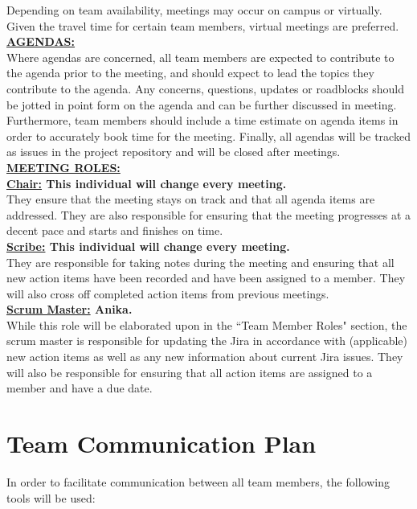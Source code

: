 \documentclass{article}
\begin{document}
Depending on team availability, meetings may occur on campus or virtually. 
Given the travel time for certain team members, virtual meetings are preferred.\\

\noindent \textbf{\underline{AGENDAS:}} \\

Where agendas are concerned, all team members are expected to contribute to the agenda prior to the meeting, 
and should expect to lead the topics they contribute to the agenda. 
Any concerns, questions, updates or roadblocks should be jotted in point form on the agenda and can be further discussed in meeting. 
Furthermore, team members should include a time estimate on agenda items in order to accurately book time for the meeting.
Finally, all agendas will be tracked as issues in the project repository and will be closed after meetings. \\

\noindent \textbf{\underline{MEETING ROLES:}} \\

\noindent \textbf{\underline{Chair:} This individual will change every meeting. } \\
\noindent They ensure that the meeting stays on track and that all agenda items are addressed. 
They are also responsible for ensuring that the meeting progresses at a decent pace and starts and finishes on time. \\

\noindent \textbf{\underline{Scribe:} This individual will change every meeting.} \\
\noindent They are responsible for taking notes during the meeting and ensuring that 
all new action items have been recorded and have been assigned to a member.
They will also cross off completed action items from previous meetings.\\

\noindent \textbf{\underline{Scrum Master:} Anika.} \\
\noindent While this role will be elaborated upon in the ``Team Member Roles" section, the scrum master 
is responsible for updating the Jira in accordance with (applicable) new action items 
as well as any new information about current Jira issues.
They will also be responsible for ensuring that all action items are assigned to a member and have a due date.\\



\section{Team Communication Plan}
In order to facilitate communication between all team members, the following tools will be used:
\end{document}
